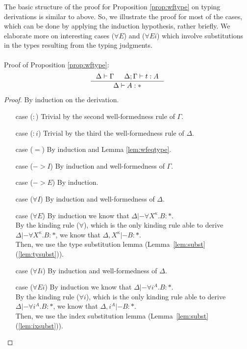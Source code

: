 The basic structure of the proof for Proposition \ref{prop:wftype}
on typing derivations is similar to above. So, we illustrate the proof
for most of the cases, which can be done by applying the induction hypothesis,
rather briefly. We elaborate more on interesting cases ($\forall E$) and
($\forall Ei$) which involve substitutions in the types resulting from
the typing judgments.

\paragraph{}
Proof of Proposition \ref{prop:wftype}:
\[ \inference{ \Delta |- \Gamma & \Delta;\Gamma |- t : A}{ \Delta |- A : * }
\]
\begin{proof} By induction on the derivation.
\begin{itemize}
\item[case] ($:$)
	Trivial by the second well-formedness rule of $\Gamma$.
\item[case] ($:i$)
	Trivial by the third the well-formedness rule of $\Delta$.
\item[case] ($=$)
	By induction and Lemma \ref{lem:wfeqtype}.
\item[case] ($->$$I$)
	By induction and well-formedness of $\Gamma$.
\item[case] ($->$$E$)
	By induction.
\item[case] ($\forall I$)
	By induction and well-formedness of $\Delta$.
\item[case] ($\forall E$)
	By induction we know that $\Delta |- \forall X^\kappa.B : *$.\\
	By the kinding rule ($\forall$), which is the only kinding rule
	able to derive $\Delta |- \forall X^\kappa.B : *$, we know
	that $\Delta,X^\kappa |- B : *$.\\
	Then, we use the type substitution lemma
	(Lemma~\ref{lem:subst}(\ref{lem:tysubst})).
\item[case] ($\forall Ii$)
	By induction and well-formedness of $\Delta$.
\item[case] ($\forall Ei$)
	By induction we know that $\Delta |- \forall i^A.B : *$.\\
	By the kinding rule ($\forall i$), which is the only kinding rule
	able to derive $\Delta |- \forall i^A.B : *$, we know
	that $\Delta,i^A |- B : *$.\\
	Then, we use the index substitution lemma
	(Lemma~\ref{lem:subst}(\ref{lem:ixsubst})).\qedhere
\end{itemize}
\end{proof}



